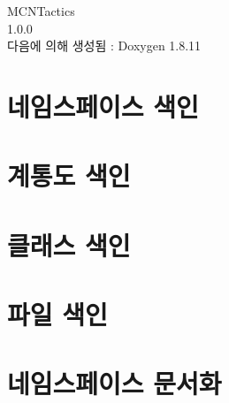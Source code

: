 \documentclass[twoside]{book}
\newcommand{\+}{\discretionary{\mbox{\scriptsize$\hookleftarrow$}}{}{}}
\newcommand{\clearemptydoublepage}{%
  \newpage{\pagestyle{empty}\cleardoublepage}%
}
\begin{document}
\hypersetup{pageanchor=false,
             bookmarksnumbered=true,
             pdfencoding=unicode
            }
\begin{titlepage}
\vspace*{7cm}
\begin{center}%
{\Large M\+C\+N\+Tactics \\[1ex]\large 1.\+0.\+0 }\\
\vspace*{1cm}
{\large 다음에 의해 생성됨 \+:  Doxygen 1.8.11}\\
\end{center}
\end{titlepage}
\clearemptydoublepage
\tableofcontents
\clearemptydoublepage
{}
\hypersetup{pageanchor=true}

\chapter{네임스페이스 색인}

\chapter{계통도 색인}

\chapter{클래스 색인}

\chapter{파일 색인}

\chapter{네임스페이스 문서화}

\end{document}
